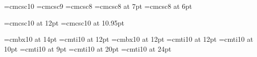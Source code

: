 






\def\sc{\fam\scfam\tensc}
\newfam\scfam
\font\tensc=cmcsc10
\font\ninesc=cmcsc9
\font\eightsc=cmcsc8
\font\sevensc=cmcsc8 at 7pt
\font\sixsc=cmcsc8 at 6pt



\font\twelvesc=cmcsc10 at 12pt
\font\elevensc=cmcsc10 at 10.95pt



\def\eightfonts{%
   \global\font\eightrm=cmr8
   \global\font\eighti=cmmi8
   \global\font\eightsy=cmsy8
   \global\font\eightex=cmex10
   \global\font\eightbf=cmbx8
   \global\font\eightsl=cmsl8
   \global\font\eighttt=cmtt8
   \global\font\eightit=cmti8
   \skewchar\eighti='177
   \skewchar\eightsy='60
   \hyphenchar\eighttt=-1
   \moreeightfonts                               %
   \gdef\eightfonts{\relax}}

\def\moreeightfonts{\relax}                      %


\message{8pt,}
\def\eightpoint{\eightfonts               %
   \def\rm{\fam0\eightrm}%
   \textfont0=\eightrm\scriptfont0=\sevenrm\scriptscriptfont0=\fiverm
   \textfont1=\eighti\scriptfont1=\seveni\scriptscriptfont1=\fivei
   \textfont2=\eightsy\scriptfont2=\sevensy\scriptscriptfont2=\fivesy
   \textfont3=\eightex\scriptfont3=\eightex\scriptscriptfont3=\eightex
   \textfont\itfam=\eightit\def\it{\fam\itfam\eightit}%
   \textfont\slfam=\eightsl\def\sl{\fam\slfam\eightsl}%
   \textfont\ttfam=\eighttt\def\tt{\fam\ttfam\eighttt}%
   \textfont\bffam=\eightbf
   \scriptfont\bffam=\sevenbf
   \scriptscriptfont\bffam=\fivebf\def\bf{\fam\bffam\eightbf}%
   \def\mib{\relax}%
   \def\scr{\relax}%
   \tt\ttglue=.5emplus.25emminus.15em
   \normalbaselineskip=11pt
   \setbox\strutbox=\hbox{\vrule height 8pt depth 3pt width 0pt}%
   \normalbaselines\rm\singlespaced}%

\font\chapfont=cmbx10  at 14pt
\font\chapsfont=cmti10 at 12pt
\font\secfont=cmbx10 at 12pt
\font\subsecfont=cmti10 at 12pt
\font\headlinefont=cmti10 at 10pt %
\font\foliofont=cmti10 at 9pt    %
\font\titlesmall=cmti10 at 20pt   %
\font\titlebig=cmti10 at 24pt     %
\edef\Tbf{\chapfont}    %
\edef\tbf{\secfont}
\edef\Tbfs{\chapsfont}

